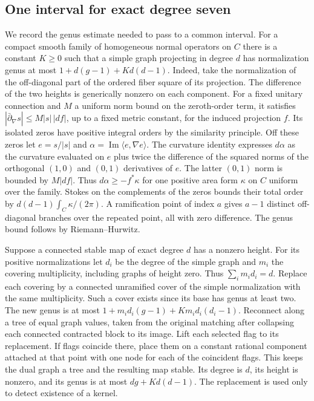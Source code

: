 \subsection{One interval for exact degree seven}
We record the genus estimate needed to pass to a common interval. For
a compact smooth family of homogeneous normal operators on $C$ there
is a constant $K\ge0$ such that a simple graph projecting in degree
$d$ has normalization genus at most $1+d(g-1)+Kd(d-1)$. Indeed, take
the normalization of the off-diagonal part of the ordered fiber
square of its projection. The difference of the two heights is
generically nonzero on each component. For a fixed unitary connection
and $M$ a uniform norm bound on the zeroth-order term, it satisfies
$|\bar\partial_\nabla s|\le M|s|\,|df|$, up to a fixed metric
constant, for the induced projection $f$. Its isolated zeros have
positive integral orders by the similarity principle. Off these
zeros let $e=s/|s|$ and $\alpha=\operatorname{Im}\langle
e,\nabla e\rangle$. The curvature identity expresses $d\alpha$ as
the curvature evaluated on $e$ plus twice the difference of the squared
norms of the orthogonal $(1,0)$ and $(0,1)$ derivatives of $e$.
The latter $(0,1)$ norm is bounded by $M|df|$. Thus
$d\alpha\ge-f^*\kappa$ for one positive area form $\kappa$ on $C$
uniform over the family. Stokes on the complements of the zeros bounds
their total order by $d(d-1)\int_C\kappa/(2\pi)$.
A ramification point of index $a$ gives $a-1$ distinct off-diagonal
branches over the repeated point, all with zero difference. The genus
bound follows by Riemann--Hurwitz.

Suppose a connected stable map of exact degree $d$ has a nonzero
height. For its positive normalizations let $d_i$ be the degree of
the simple graph and $m_i$ the covering multiplicity, including graphs
of height zero. Thus $\sum_i m_i d_i=d$. Replace each covering by a
connected unramified cover of the simple normalization with the same
multiplicity. Such a cover exists since its base has genus at least
two. The new genus is at most
$1+m_i d_i(g-1)+K m_i d_i(d_i-1)$. Reconnect along a tree of equal
graph values, taken from the original matching after collapsing each
connected contracted block to its image. Lift each selected flag to
its replacement. If flags coincide there, place them on a constant
rational component attached at that point with one node for each of
the coincident flags. This keeps the dual graph a tree and the
resulting map stable. Its degree is $d$, its height is nonzero, and
its genus is at most $dg+Kd(d-1)$. The replacement is used only to
detect existence of a kernel.

